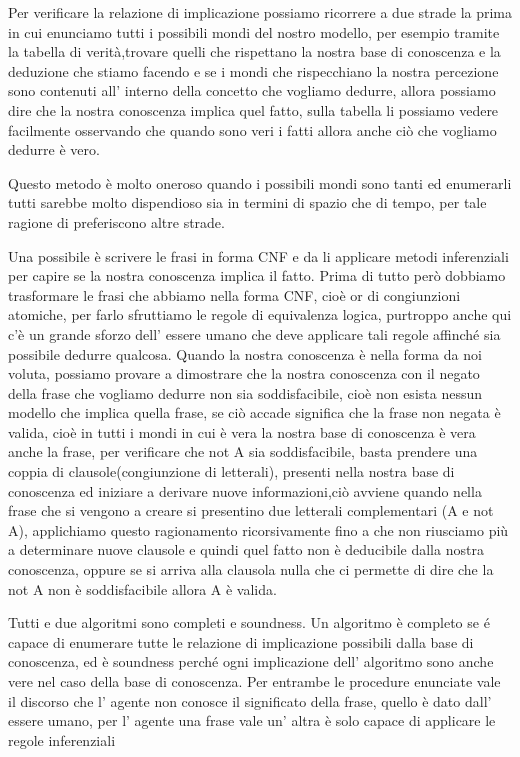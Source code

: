 		Per verificare la relazione di implicazione possiamo ricorrere a due strade la prima in cui enunciamo tutti i possibili mondi del nostro modello, per esempio tramite la tabella di verità,trovare quelli che rispettano la nostra base di conoscenza e la deduzione che stiamo facendo e se i mondi che rispecchiano la nostra percezione sono contenuti all' interno della concetto che vogliamo dedurre, allora possiamo dire che la nostra conoscenza implica quel fatto, sulla tabella li possiamo vedere facilmente osservando che quando sono veri i fatti allora anche ciò che vogliamo dedurre è vero.
		\par
		Questo metodo è molto oneroso quando i possibili mondi sono tanti ed enumerarli tutti sarebbe molto dispendioso sia in termini di spazio che di tempo, per tale ragione di preferiscono altre strade.
		\par
		Una possibile è scrivere le frasi in forma CNF e da li applicare metodi inferenziali per capire se la nostra conoscenza implica il fatto. 
		Prima di tutto però dobbiamo trasformare le frasi che abbiamo nella forma CNF, cioè or di congiunzioni atomiche, per farlo sfruttiamo le regole di equivalenza logica, purtroppo anche qui c'è un grande sforzo dell' essere umano che deve applicare tali regole affinché sia possibile dedurre qualcosa.
		Quando la nostra conoscenza è nella forma da noi voluta, possiamo provare a dimostrare che la nostra conoscenza con il negato della frase che vogliamo dedurre non sia soddisfacibile, cioè non esista nessun modello che implica quella frase, se ciò accade significa che la frase non negata è valida, cioè in tutti i mondi in cui è vera la nostra base di conoscenza è vera anche la frase, per verificare che not A sia soddisfacibile, basta prendere una coppia di clausole(congiunzione di letterali), presenti nella nostra base di conoscenza ed iniziare a derivare nuove informazioni,ciò avviene quando nella frase che si vengono a creare si presentino due letterali complementari (A e not A),
		applichiamo questo ragionamento ricorsivamente fino a che non riusciamo più a determinare nuove clausole e quindi quel fatto non è deducibile dalla nostra conoscenza, oppure se si arriva alla clausola nulla che ci permette di dire che la not A non è soddisfacibile allora A è valida.
		\par
		Tutti e due algoritmi sono completi e soundness.
		Un algoritmo è completo se é capace di enumerare tutte le relazione di implicazione possibili dalla base di conoscenza, ed è soundness perché ogni implicazione dell' algoritmo sono anche vere nel caso della base di conoscenza.
		Per entrambe le procedure enunciate vale il discorso che l' agente non conosce il significato della frase, quello è dato dall' essere umano, per l' agente una frase vale un' altra è solo capace di applicare le regole inferenziali
		
